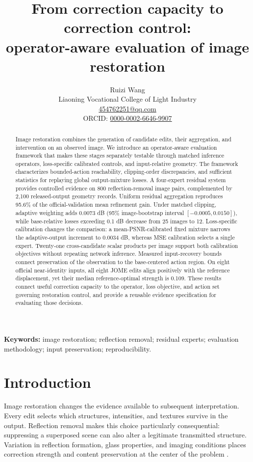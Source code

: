 \documentclass[12pt]{article}
\title{\bfseries From correction capacity to correction control:\\ operator-aware evaluation of image restoration}
\author{Ruizi Wang\\
\normalsize Liaoning Vocational College of Light Industry\\
\normalsize \href{mailto:454762251@qq.com}{454762251@qq.com}\\
\normalsize ORCID: \href{https://orcid.org/0000-0002-6646-9907}{0000-0002-6646-9907}}
\date{}
\begin{document}
\maketitle
\begin{abstract}
Image restoration combines the generation of candidate edits, their aggregation, and intervention on an observed image. We introduce an operator-aware evaluation framework that makes these stages separately testable through matched inference operators, loss-specific calibrated controls, and input-relative geometry. The framework characterizes bounded-action reachability, clipping-order discrepancies, and sufficient statistics for replaying global output-mixture losses. A four-expert residual system provides controlled evidence on 800 reflection-removal image pairs, complemented by 2,100 released-output geometry records. Uniform residual aggregation reproduces 95.6\% of the official-validation mean refinement gain. Under matched clipping, adaptive weighting adds 0.0073 dB (95\% image-bootstrap interval $[-0.0005,0.0150]$), while base-relative losses exceeding 0.1 dB decrease from 25 images to 12. Loss-specific calibration changes the comparison: a mean-PSNR-calibrated fixed mixture narrows the adaptive-output increment to 0.0034 dB, whereas MSE calibration selects a single expert. Twenty-one cross-candidate scalar products per image support both calibration objectives without repeating network inference. Measured input-recovery bounds connect preservation of the observation to the base-centered action region. On eight official near-identity inputs, all eight JOME edits align positively with the reference displacement, yet their median reference-optimal strength is 0.109. These results connect useful correction capacity to the operator, loss objective, and action set governing restoration control, and provide a reusable evidence specification for evaluating those decisions.
\end{abstract}
\noindent\textbf{Keywords:} image restoration; reflection removal; residual experts; evaluation methodology; input preservation; reproducibility.
\section{Introduction}
\label{sec:introduction}
Image restoration changes the evidence available to subsequent interpretation. Every edit selects which structures, intensities, and textures survive in the output. Reflection removal makes this choice particularly consequential: suppressing a superposed scene can also alter a legitimate transmitted structure. Variation in reflection formation, glass properties, and imaging conditions places correction strength and content preservation at the center of the problem \citep{wan2023benchmark,wen2019linearity,zheng2021absorption}.
\end{document}
